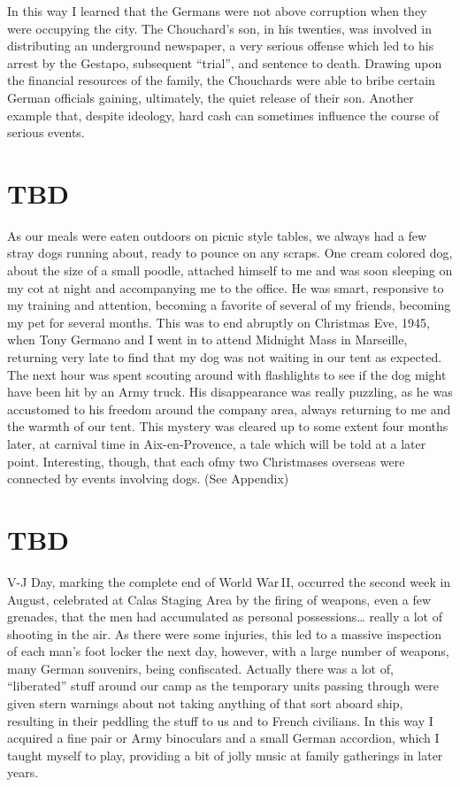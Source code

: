 \documentclass[../m3y]{subfiles}
\begin{document}
In this way I learned that the Germans were not above corruption when they were occupying the city. The Chouchard's son, in his twenties, was involved in distributing an underground newspaper, a very serious offense which led to his arrest by the Gestapo, subsequent ``trial'', and sentence to death. Drawing upon the financial resources of the family, the Chouchards were able to bribe certain German officials gaining, ultimately, the quiet release of their son. Another example that, despite ideology, hard cash can sometimes influence the course of serious events.

\section{TBD}
As our meals were eaten outdoors on picnic style tables, we always had a few stray dogs running about, ready to pounce on any scraps. One cream colored dog, about the size of a small poodle, attached himself to me and was soon sleeping on my cot at night and accompanying me to the office. He was smart, responsive to my training and attention, becoming a favorite of several of my friends, becoming my pet for several months. This was to end abruptly on Christmas Eve, 1945, when Tony Germano and I went in to attend Midnight Mass in Marseille, returning very late to find that my dog was not waiting in our tent as expected. The next hour was spent scouting around with flashlights to see if the dog might have been hit by an Army truck. His disappearance was really puzzling, as he was accustomed to his freedom around the company area, always returning to me and the warmth of our tent. This mystery was cleared up to some extent four months later, at carnival time in Aix-en-Provence, a tale which will be told at a later point. Interesting, though, that each ofmy two Christmases overseas were connected by events involving dogs. (See Appendix)

\section{TBD}
V-J Day, marking the complete end of World War\,II, occurred the second week in August, celebrated at Calas Staging Area by the firing of weapons, even a few grenades, that the men had accumulated as personal possessions… really a lot of shooting in the air. As there were some injuries, this led to a massive inspection of each man's foot locker the next day, however, with a large number of weapons, many German souvenirs, being confiscated. Actually there was a lot of, “liberated” stuff around our camp as the temporary units passing through were given stern warnings about not taking anything of that sort aboard ship, resulting in their peddling the stuff to us and to French civilians. In this way I acquired a fine pair or Army binoculars and a small German accordion, which I taught myself to play, providing a bit of jolly music at family gatherings in later years.
\end{document}

